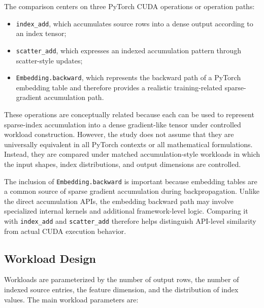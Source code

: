 The comparison centers on three PyTorch CUDA operations or operation paths:

\begin{itemize}[leftmargin=*]
    \item \texttt{index\_add}, which accumulates source rows into a dense output according to an index tensor;
    \item \texttt{scatter\_add}, which expresses an indexed accumulation pattern through scatter-style updates;
    \item \texttt{Embedding.backward}, which represents the backward path of a PyTorch embedding table and therefore provides a realistic training-related sparse-gradient accumulation path.
\end{itemize}

These operations are conceptually related because each can be used to represent sparse-index accumulation into a dense gradient-like tensor under controlled workload construction. However, the study does not assume that they are universally equivalent in all PyTorch contexts or all mathematical formulations. Instead, they are compared under matched accumulation-style workloads in which the input shapes, index distributions, and output dimensions are controlled.

The inclusion of \texttt{Embedding.backward} is important because embedding tables are a common source of sparse gradient accumulation during backpropagation. Unlike the direct accumulation APIs, the embedding backward path may involve specialized internal kernels and additional framework-level logic. Comparing it with \texttt{index\_add} and \texttt{scatter\_add} therefore helps distinguish API-level similarity from actual CUDA execution behavior.

\subsection{Workload Design}

Workloads are parameterized by the number of output rows, the number of indexed source entries, the feature dimension, and the distribution of index values. The main workload parameters are:

